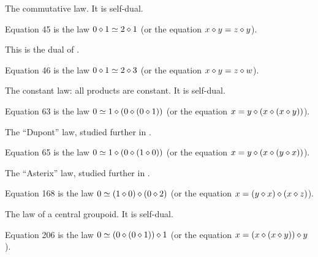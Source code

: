 The commutative law. It is self-dual.

\begin{definition}[Equation 45]\label{eq45}\leanok{}  Equation 45 is the law $0 \diamond 1  \simeq  2 \diamond 1$ (or the equation $x \diamond y = z \diamond y$).
\end{definition}

This is the dual of .

\begin{definition}[Equation 46]\label{eq46}\leanok{}  Equation 46 is the law $0 \diamond 1  \simeq  2 \diamond 3$ (or the equation $x \diamond y = z \diamond w$).
\end{definition}

The constant law: all products are constant. It is self-dual.

\begin{definition}[Equation 63]\label{eq63}\leanok{}  Equation 63 is the law $0 \simeq 1 \diamond (0 \diamond (0 \diamond 1))$ (or the equation $x = y \diamond (x \diamond (x \diamond y))$).
\end{definition}

The ``Dupont'' law, studied further in .

\begin{definition}[Equation 65]\label{eq65}\leanok{}  Equation 65 is the law $0 \simeq 1 \diamond (0 \diamond (1 \diamond 0))$ (or the equation $x = y \diamond (x \diamond (y \diamond x))$).
\end{definition}

The ``Asterix'' law, studied further in .

\begin{definition}[Equation 168]\label{eq168}\leanok{}  Equation 168 is the law $0  \simeq  (1 \diamond 0) \diamond (0 \diamond 2)$ (or the equation $x = (y \diamond x) \diamond (x \diamond z)$).
\end{definition}

The law of a central groupoid. It is self-dual.

\begin{definition}[Equation 206]\label{eq206}\leanok{}  Equation 206 is the law $0  \simeq  (0 \diamond (0 \diamond 1)) \diamond 1$ (or the equation $x = (x \diamond (x \diamond y)) \diamond y$).
\end{definition}

